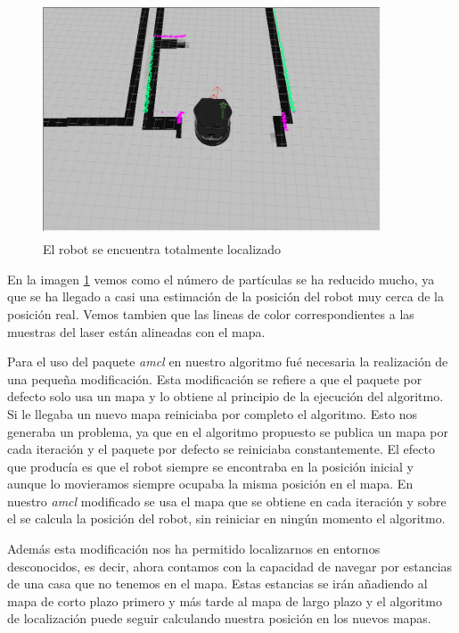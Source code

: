 \begin{figure}[hbtp]
  \begin{center}
    \includegraphics[width=10cm,height=7cm]{img/cap5/finamcl}
  \end{center}
  \caption{El robot se encuentra totalmente localizado}
  \label{fig:finamcl}
\end{figure}

En la imagen \ref{fig:finamcl} vemos como el número de partículas se ha reducido mucho, ya que se ha llegado a casi una estimación de la posición del robot muy cerca de la posición real. Vemos tambien que las lineas de color correspondientes a las muestras del laser están alineadas con el mapa.

Para el uso del paquete \textit{amcl} en nuestro algoritmo fué necesaria la realización de una pequeña modificación. Esta modificación se refiere a que el paquete por defecto solo usa un mapa y lo obtiene al principio de la ejecución del algoritmo. Si le llegaba un nuevo mapa reiniciaba por completo el algoritmo. Esto nos generaba un problema, ya que en el algoritmo propuesto se publica un mapa por cada iteración y el paquete por defecto se reiniciaba constantemente. El efecto que producía es que el robot siempre se encontraba en la posición inicial y aunque lo movieramos siempre ocupaba la misma posición en el mapa. En nuestro \textit{amcl} modificado se usa el mapa que se obtiene en cada iteración y sobre el se calcula la posición del robot, sin reiniciar en ningún momento el algoritmo.

Además esta modificación nos ha permitido localizarnos en entornos desconocidos, es decir, ahora contamos con la capacidad de navegar por estancias de una casa que no tenemos en el mapa. Estas estancias se irán añadiendo al mapa de corto plazo primero y más tarde al mapa de largo plazo y el algoritmo de localización puede seguir calculando nuestra posición en los nuevos mapas.